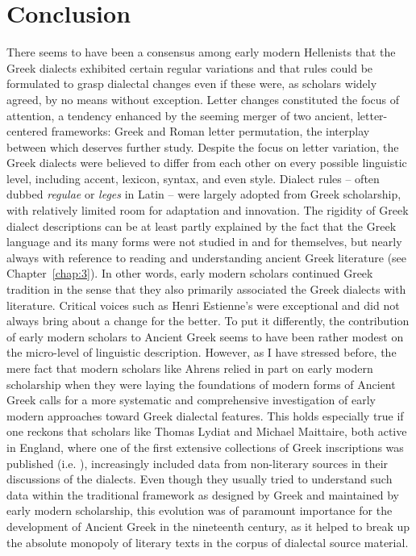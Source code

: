 \section{Conclusion}\label{sec:6.5}

There seems to have been a consensus among early modern Hellenists that the Greek dialects exhibited certain regular variations and that rules could be formulated to grasp dialectal changes even if these were, as scholars widely agreed, by no means without exception. Letter changes constituted the focus of attention, a tendency enhanced by the seeming merger of two ancient, letter-centered frameworks: Greek  and Roman letter permutation, the interplay between which deserves further study. Despite the focus on letter variation, the Greek dialects were believed to differ from each other on every possible linguistic level, including accent, lexicon, syntax, and even style. Dialect rules – often dubbed \textit{regulae} or \textit{leges} in Latin – were largely adopted from Greek scholarship, with relatively limited room for adaptation and innovation. The rigidity of Greek dialect descriptions can be at least partly explained by the fact that the Greek language and its many forms were not studied in and for themselves, but nearly always with reference to reading and understanding ancient Greek literature (see Chapter~\ref{chap:3}). In other words, early modern scholars continued Greek tradition in the sense that they also primarily associated the Greek dialects with literature. Critical voices such as Henri Estienne’s were exceptional and did not always bring about a change for the better. To put it differently, the contribution of early modern scholars to Ancient Greek  seems to have been rather modest on the micro-level of linguistic description. However, as I have stressed before, the mere fact that modern scholars like Ahrens relied in part on early modern scholarship when they were laying the foundations of modern forms of Ancient Greek  calls for a more systematic and comprehensive investigation of early modern approaches toward Greek dialectal features. This holds especially true if one reckons that scholars like Thomas Lydiat and Michael Maittaire, both active in England, where one of the first extensive collections of Greek inscriptions was published (i.e. \citealt{Prideaux1676}), increasingly included data from non-literary sources in their discussions of the dialects. Even though they usually tried to understand such data within the traditional framework as designed by Greek and maintained by early modern scholarship, this evolution was of paramount importance for the development of Ancient Greek  in the nineteenth century, as it helped to break up the absolute monopoly of literary texts in the corpus of dialectal source material.

